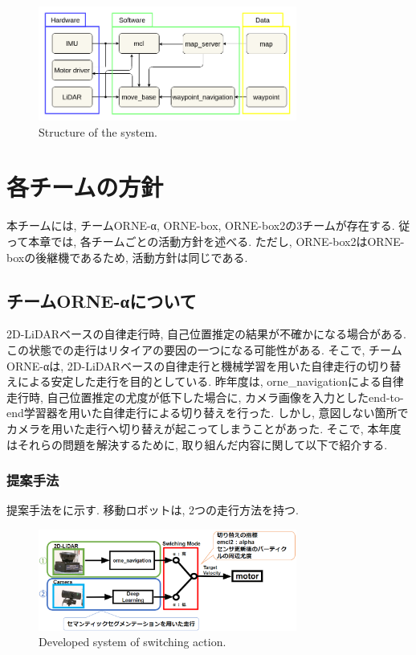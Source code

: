 \documentclass[uplatex, twocolumn, 9pt]{jsproceedings}
\begin{document}
\begin{figure}[h]
  \centering
  \includegraphics[width=85mm]{fig/software.pdf}
  \caption{Structure of the system.}
  \label{fig:soft-fig}%
\end{figure}

\section{各チームの方針}
本チームには, チームORNE-α, ORNE-box, ORNE-box2の3チームが存在する. 従って本章では, 各チームごとの活動方針を述べる. ただし, ORNE-box2はORNE-boxの後継機であるため, 活動方針は同じである.

\subsection{チームORNE-αについて}
2D-LiDARベースの自律走行時, 自己位置推定の結果が不確かになる場合がある. この状態での走行はリタイアの要因の一つになる可能性がある. そこで, チームORNE-αは, 2D-LiDARベースの自律走行と機械学習を用いた自律走行の切り替えによる安定した走行を目的としている. 昨年度は, orne\_navigationによる自律走行時, 自己位置推定の尤度が低下した場合に, カメラ画像を入力としたend-to-end学習器を用いた自律走行による切り替えを行った. しかし, 意図しない箇所でカメラを用いた走行へ切り替えが起こってしまうことがあった. そこで, 本年度はそれらの問題を解決するために, 取り組んだ内容に関して以下で紹介する. 

\subsubsection{提案手法}
提案手法をに示す. 移動ロボットは, 2つの走行方法を持つ. 

\begin{figure}[h]
  \centering
  \includegraphics[width=85mm]{fig/kirikae.pdf}
  \caption{Developed system of switching action.}
  \label{fig:kirikae}%
\end{figure}
\end{document}
